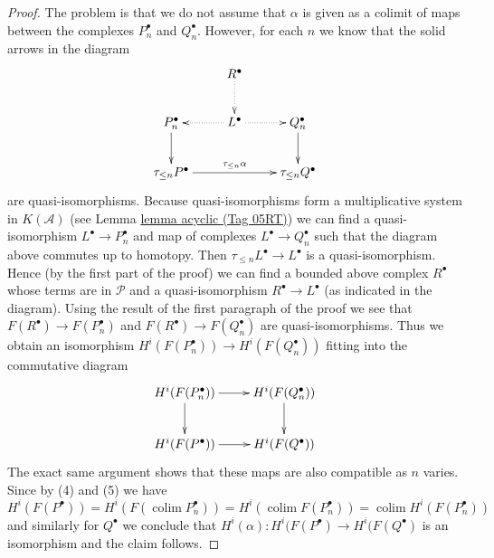 \documentclass{amsart}
\theoremstyle{plain}
\theoremstyle{definition}
\theoremstyle{remark}
\numberwithin{equation}{subsection}
\def\colim{\mathop{\mathrm{colim}}\nolimits}
\begin{document}
\begin{proof}
\medskip\noindent
The problem is that we do not assume that $\alpha$ is given as a colimit
of maps between the complexes $P_n^\bullet$ and $Q_n^\bullet$. However,
for each $n$ we know that the solid arrows in the diagram
$$
\xymatrix{
& R^\bullet \ar@{..>}[d] \\
P_n^\bullet \ar[d] &
L^\bullet \ar@{..>}[l] \ar@{..>}[r] &
Q_n^\bullet \ar[d] \\
\tau_{\leq n}P^\bullet \ar[rr]^{\tau_{\leq n}\alpha} & &
\tau_{\leq n}Q^\bullet
}
$$
are quasi-isomorphisms. Because quasi-isomorphisms form a multiplicative
system in $K(\mathcal{A})$ (see Lemma \href{https://stacks.math.columbia.edu/tag/05RT}{lemma acyclic (Tag 05RT)})
we can find a quasi-isomorphism
$L^\bullet \to P_n^\bullet$ and map of complexes $L^\bullet \to Q_n^\bullet$
such that the diagram above commutes up to homotopy. Then
$\tau_{\leq n}L^\bullet \to L^\bullet$ is a quasi-isomorphism.
Hence (by the first part of the proof) we can find a bounded above
complex $R^\bullet$ whose terms are in $\mathcal{P}$ and a quasi-isomorphism
$R^\bullet \to L^\bullet$ (as indicated in the diagram). Using the result
of the first paragraph of the proof we see that
$F(R^\bullet) \to F(P_n^\bullet)$ and $F(R^\bullet) \to F(Q_n^\bullet)$
are quasi-isomorphisms. Thus we obtain an isomorphism
$H^i(F(P_n^\bullet)) \to H^i(F(Q_n^\bullet))$ fitting into the commutative
diagram
$$
\xymatrix{
H^i(F(P_n^\bullet)) \ar[r] \ar[d] &
H^i(F(Q_n^\bullet)) \ar[d] \\
H^i(F(P^\bullet)) \ar[r] &
H^i(F(Q^\bullet))
}
$$
The exact same argument shows that these maps are also compatible
as $n$ varies. Since by (4) and (5) we have
$$
H^i(F(P^\bullet)) =
H^i(F(\colim P_n^\bullet)) =
H^i(\colim F(P_n^\bullet)) = \colim H^i(F(P_n^\bullet))
$$
and similarly for $Q^\bullet$ we conclude that
$H^i(\alpha) : H^i(F(P^\bullet) \to H^i(F(Q^\bullet)$ is an isomorphism
and the claim follows.
\end{proof}
\end{document}
